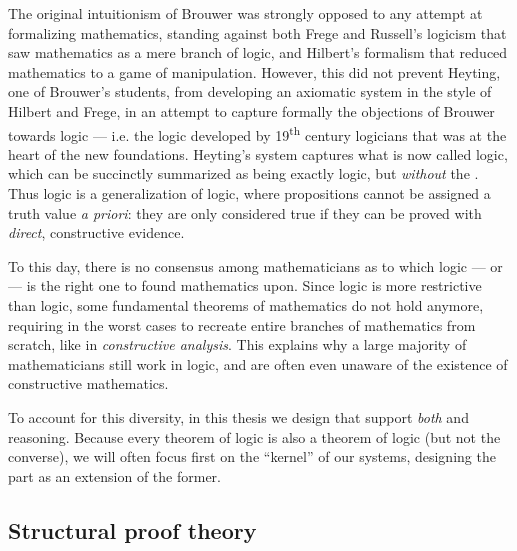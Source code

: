 \AP
The original intuitionism of Brouwer was strongly opposed to any attempt at
formalizing mathematics, standing against both Frege and Russell's logicism that
saw mathematics as a mere branch of logic, and Hilbert's formalism that reduced
mathematics to a game of  manipulation. However, this did not prevent
Heyting, one of Brouwer's students, from developing an axiomatic system in the
style of Hilbert and Frege, in an attempt to capture formally the objections of
Brouwer towards  logic --- i.e. the logic developed by
19\textsuperscript{th} century logicians that was at the heart of the new
 foundations. Heyting's system captures what is now called
 logic, which can be succinctly summarized as being
exactly  logic, but \emph{without} the . Thus  logic is a generalization of 
logic, where propositions cannot be assigned a truth value \emph{a priori}: they
are only considered true if they can be proved with \emph{direct}, constructive
evidence.

To this day, there is no consensus among mathematicians as to which logic ---
 or  --- is the right one to found mathematics upon.
Since  logic is more restrictive than  logic, some
fundamental theorems of  mathematics do not hold anymore, requiring in
the worst cases to recreate entire branches of mathematics from scratch, like in
\emph{constructive analysis}. This explains why a large majority of
mathematicians still work in  logic, and are often even unaware of the
existence of constructive mathematics.

\begin{emphpar}
To account for this diversity, in this thesis we design  that
support \emph{both}  and  reasoning. Because every
theorem of  logic is also a theorem of  logic (but not
the converse), we will often focus first on the  ``kernel'' of our
systems, designing the  part as an extension of the former.
\end{emphpar}

\subsection{Structural proof theory}

